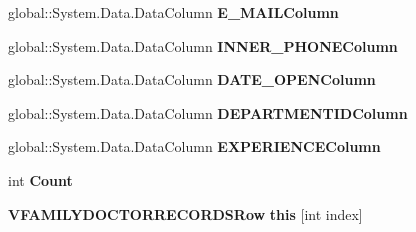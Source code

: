 \begin{CompactItemize}
\item 
global::System.Data.DataColumn \textbf{E\_\-MAILColumn}\hspace{0.3cm}{\tt  [get]}\label{class_automatic_medical_system_1_1_data_set1_1_1_v_f_a_m_i_l_y_d_o_c_t_o_r_r_e_c_o_r_d_s_data_table_e00a43fc607ce12e50f690a5a744fdd2}

\item 
global::System.Data.DataColumn \textbf{INNER\_\-PHONEColumn}\hspace{0.3cm}{\tt  [get]}\label{class_automatic_medical_system_1_1_data_set1_1_1_v_f_a_m_i_l_y_d_o_c_t_o_r_r_e_c_o_r_d_s_data_table_0c9cc28bf998b543b7533826de07b2da}

\item 
global::System.Data.DataColumn \textbf{DATE\_\-OPENColumn}\hspace{0.3cm}{\tt  [get]}\label{class_automatic_medical_system_1_1_data_set1_1_1_v_f_a_m_i_l_y_d_o_c_t_o_r_r_e_c_o_r_d_s_data_table_1ebcb9bfabe8777a5fc2f7a553196b95}

\item 
global::System.Data.DataColumn \textbf{DEPARTMENTIDColumn}\hspace{0.3cm}{\tt  [get]}\label{class_automatic_medical_system_1_1_data_set1_1_1_v_f_a_m_i_l_y_d_o_c_t_o_r_r_e_c_o_r_d_s_data_table_559d99dc2bb4c2ab18e3e571c059f227}

\item 
global::System.Data.DataColumn \textbf{EXPERIENCEColumn}\hspace{0.3cm}{\tt  [get]}\label{class_automatic_medical_system_1_1_data_set1_1_1_v_f_a_m_i_l_y_d_o_c_t_o_r_r_e_c_o_r_d_s_data_table_2ad0906fdbf17689ff2696d21bd9209b}

\item 
int \textbf{Count}\hspace{0.3cm}{\tt  [get]}\label{class_automatic_medical_system_1_1_data_set1_1_1_v_f_a_m_i_l_y_d_o_c_t_o_r_r_e_c_o_r_d_s_data_table_ccb79e1bfaa7f47ea0b1999b42a8ec37}

\item 
{\bf VFAMILYDOCTORRECORDSRow} \textbf{this} [int index]\hspace{0.3cm}{\tt  [get]}\label{class_automatic_medical_system_1_1_data_set1_1_1_v_f_a_m_i_l_y_d_o_c_t_o_r_r_e_c_o_r_d_s_data_table_2c44296a33af4a4d48ae325dc29e4058}

\end{CompactItemize}
